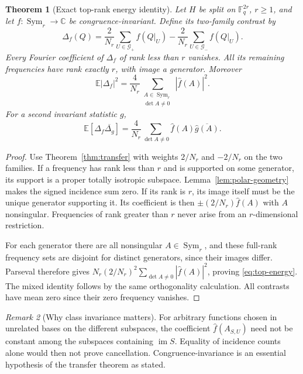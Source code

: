 \documentclass[11pt,a4paper]{article}
\newtheorem{theorem}{Theorem}[section]
\theoremstyle{definition}
\theoremstyle{remark}
\newtheorem{remark}[theorem]{Remark}
\newcommand{\F}{\mathbb F}
\newcommand{\C}{\mathbb C}
\newcommand{\E}{\mathbb E}
\newcommand{\Sym}{\operatorname{Sym}}
\newcommand{\im}{\operatorname{im}}
\newcommand{\G}{\mathcal G}
\begin{document}
\begin{theorem}[Exact top-rank energy identity]\label{thm:top-rank}
Let $H$ be split on $\F_q^{2r}$, $r\ge1$, and let $f:\Sym_r\to\C$ be
congruence-invariant. Define its two-family contrast by
\[
 \Delta_f(Q)=\frac2{N_r}\sum_{U\in\G_+}f(Q|_U)
             -\frac2{N_r}\sum_{U\in\G_-}f(Q|_U).
\]
Every Fourier coefficient of $\Delta_f$ of rank less than $r$ vanishes.
All its remaining frequencies have rank exactly $r$, with image a
generator. Moreover
\begin{equation}\label{eq:top-energy}
 \boxed{\displaystyle
 \E|\Delta_f|^2=\frac4{N_r}
             \sum_{\substack{A\in\Sym_r\\\det A\ne0}}|\widehat f(A)|^2.}
\end{equation}
For a second invariant statistic $g$,
\begin{equation}\label{eq:top-cross-energy}
 \E[\Delta_f\overline{\Delta_g}]
 =\frac4{N_r}\sum_{\det A\ne0}\widehat f(A)\overline{\widehat g(A)}.
\end{equation}
\end{theorem}
\begin{proof}
Use Theorem~\ref{thm:transfer} with weights $2/N_r$ and $-2/N_r$ on the
two families. If a frequency has rank less than $r$ and is supported on
some generator, its support is a proper totally isotropic subspace.
Lemma~\ref{lem:polar-geometry} makes the signed incidence sum zero.
If its rank is $r$, its image itself must be the unique generator
supporting it. Its coefficient is then $\pm(2/N_r)\widehat f(A)$ with
$A$ nonsingular. Frequencies of rank greater than $r$ never arise from
an $r$-dimensional restriction.

For each generator there are all nonsingular $A\in\Sym_r$, and these
full-rank frequency sets are disjoint for distinct generators, since
their images differ. Parseval therefore gives
$N_r(2/N_r)^2\sum_{\det A\ne0}|\widehat f(A)|^2$, proving
\eqref{eq:top-energy}. The mixed identity follows by the same orthogonality
calculation. All contrasts have mean zero since their zero frequency
vanishes.
\end{proof}

\begin{remark}[Why class invariance matters]
For arbitrary functions chosen in unrelated bases on the different
subspaces, the coefficient $\widehat f(A_{S,U})$ need not be constant
among the subspaces containing $\im S$. Equality of incidence counts
alone would then not prove cancellation. Congruence-invariance is an
essential hypothesis of the transfer theorem as stated.
\end{remark}
\end{document}
